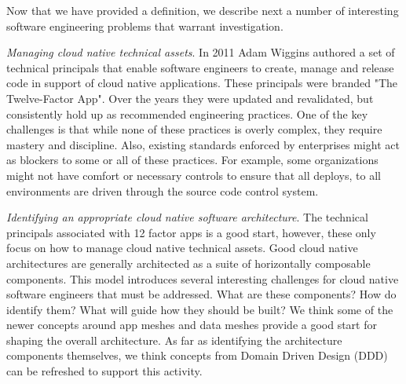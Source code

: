 \documentclass[conference]{IEEEconf}
\begin{document}
Now that we have provided a definition, we describe next a number of interesting software engineering problems that warrant investigation.

\textit{Managing cloud native technical assets}.  In 2011 Adam Wiggins authored a set of technical principals that enable software engineers to create, manage and release code in support of cloud native applications. These principals were branded "The Twelve-Factor App"\cite{12factor}.  Over the years they were updated and revalidated\cite{hoffman2016beyond, 12factorRevisited}, but consistently hold up as recommended engineering practices. One of the key challenges is that while none of these practices is overly complex, they require mastery and discipline. Also, existing standards enforced by enterprises might act as blockers to some or all of these practices.  For example, some organizations might not have comfort or necessary controls to ensure that all deploys, to all environments are driven through the source code control system.

\textit{Identifying an appropriate cloud native software architecture}.  The technical principals associated with 12 factor apps is a good start, however, these only focus on how to manage cloud native technical assets.  Good cloud native architectures are generally architected as a suite of horizontally composable components. This model introduces several interesting challenges for cloud native software engineers that must be addressed. What are these components? How do identify them? What will guide how they should be built? We think some of the newer concepts around app meshes\cite{GartnerMASA} and data meshes\cite{datamesh} provide a good start for shaping the overall architecture.  As far as identifying the architecture components themselves, we think concepts from Domain Driven Design (DDD)\cite{evans2004domain, vernon2013implementing} can be refreshed to support this activity.
\end{document}
